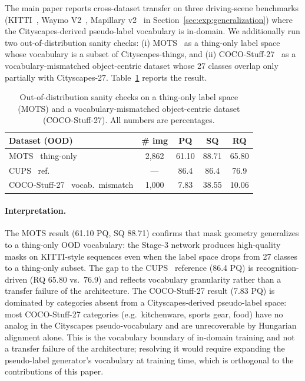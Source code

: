 \documentclass{article}
\begin{document}
The main paper reports cross-dataset transfer on three driving-scene benchmarks (KITTI~\cite{geiger2012kitti}, Waymo V2~\cite{sun2020waymo}, Mapillary v2~\cite{neuhold2017mapillary} in Section~\ref{sec:exp:generalization}) where the Cityscapes-derived pseudo-label vocabulary is in-domain. We additionally run two out-of-distribution sanity checks: (i) MOTS~\cite{voigtlaender2019mots} as a thing-only label space whose vocabulary is a subset of Cityscapes-things, and (ii) COCO-Stuff-27~\cite{caesar2018coco} as a vocabulary-mismatched object-centric dataset whose 27 classes overlap only partially with Cityscapes-27. Table~\ref{tab:cocooo} reports the result.

\begin{table}[H]
\caption{Out-of-distribution sanity checks on a thing-only label space (MOTS) and a vocabulary-mismatched object-centric dataset (COCO-Stuff-27). All numbers are percentages.}
\label{tab:cocooo}
\centering
\footnotesize
\setlength{\tabcolsep}{6pt}
\begin{tabular}{l c c c c}
\toprule
Dataset (OOD) & \# img & PQ & SQ & RQ \\
\midrule
MOTS~\cite{voigtlaender2019mots} thing-only & 2{,}862 & 61.10 & 88.71 & 65.80 \\
\quad CUPS~\cite{hahn2025cups} ref. & --- & 86.4 & 86.4 & 76.9 \\
COCO-Stuff-27~\cite{caesar2018coco} vocab.\ mismatch & 1{,}000 & \phantom{0}7.83 & 38.55 & 10.06 \\
\bottomrule
\end{tabular}
\end{table}

\paragraph{Interpretation.}
The MOTS result (61.10 PQ, SQ 88.71) confirms that mask geometry generalizes to a thing-only OOD vocabulary: the Stage-3 network produces high-quality masks on KITTI-style sequences even when the label space drops from 27 classes to a thing-only subset. The gap to the CUPS~\cite{hahn2025cups} reference (86.4 PQ) is recognition-driven (RQ 65.80 vs.\ 76.9) and reflects vocabulary granularity rather than a transfer failure of the architecture. The COCO-Stuff-27 result (7.83 PQ) is dominated by categories absent from a Cityscapes-derived pseudo-label space: most COCO-Stuff-27 categories (e.g.\ kitchenware, sports gear, food) have no analog in the Cityscapes pseudo-vocabulary and are unrecoverable by Hungarian alignment alone. This is the vocabulary boundary of in-domain training and not a transfer failure of the architecture; resolving it would require expanding the pseudo-label generator's vocabulary at training time, which is orthogonal to the contributions of this paper.
\end{document}
